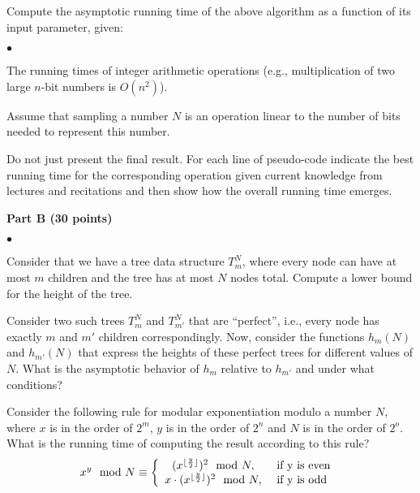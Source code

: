 \documentclass{article}
\newenvironment{myitem}{\begin{list}{$\bullet$}
{\setlength{\itemsep}{-0pt}
\setlength{\topsep}{0pt}
\setlength{\labelwidth}{0pt}
\setlength{\leftmargin}{10pt}
\setlength{\parsep}{-0pt}
\setlength{\itemsep}{0pt}
\setlength{\partopsep}{0pt}}}%
{\end{list}}
\begin{document}
\newpage

 Compute the asymptotic running time of the
above algorithm as a function of its input parameter, given:

\begin{myitem}
\item The running times of integer arithmetic operations (e.g.,
  multiplication of two large $n$-bit numbers is $O(n^2)$).
\item Assume that sampling a number $N$ is an operation linear to the
  number of bits needed to represent this number.
\end{myitem}

\noindent Do not just present the final result. For each line of
pseudo-code indicate the best running time for the corresponding
operation given current knowledge from lectures and recitations and
then show how the overall running time emerges.\\

\begin{center}
{\bf Part B (30 points)}
\end{center}

\begin{myitem}
\item Consider that we have a tree data structure $T_m^N$, where every
  node can have at most $m$ children and the tree has at most $N$
  nodes total. Compute a lower bound for the height of the tree.\\

\item Consider two such trees $T_m^N$ and $T_{m'}^N$ that are
  ``perfect'', i.e., every node has exactly $m$ and $m'$ children
  correspondingly. Now, consider the functions $h_m(N)$ and
  $h_{m'}(N)$ that express the heights of these perfect trees for
  different values of $N$. What is the asymptotic behavior of $h_m$
  relative to $h_{m'}$ and under what conditions?\\

\item Consider the following rule for modular exponentiation modulo a
  number $N$, where $x$ is in the order of $2^m$, $y$ is in the order
  of $2^n$ and $N$ is in the order of $2^o$. What is the running time
  of computing the result according to this rule?
$$x^y \mod N \equiv \left\{
\begin{array}{c l}     
    (x ^{\lfloor \frac{y}{2} \rfloor} )^2 \mod N,  & \textrm{ if y is even }\\
    x \cdot (x^{\lfloor \frac{y}{2} \rfloor} )^2 \mod N, & \textrm{ if y is odd}
\end{array}\right.$$
\end{myitem}
\end{document}
